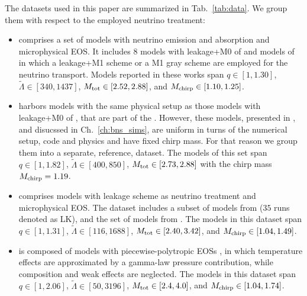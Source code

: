 The datasets used in this paper are summarized in Tab.~\ref{tab:data}.
We group them with respect to the employed neutrino treatment:

\begin{itemize}
    \item \DSheatcool{} comprises a set of models with neutrino emission 
    and absorption and microphysical \ac{EOS}. It includes 
    $8$ models with leakage+M0 of \cite{Radice:2018pdn} and models 
    of \cite{Sekiguchi:2015dma,Sekiguchi:2016bjd,Vincent:2019kor}
    in which a leakage+M1 scheme or a M1 gray scheme are employed for the neutrino transport. 
    Models reported in these works span 
    $q\in[1, 1.30]$, 
    $\tilde{\Lambda}\in[340, 1437]$, 
    $M_{\rm tot}\in[2.52,2.88]$, 
    and $M_{\rm chirp}\in[1.10,1.25]$.
    \item \DSrefset{} harbors models with the same physical setup as 
    those models with leakage+M0 of \cite{Radice:2018pdn}, that are 
    part of the \DSheatcool{}. However, these models, presented in 
    \cite{Perego:2019adq,Nedora:2019jhl,Bernuzzi:2020txg,Nedora:2020pak}, 
    and disucssed in Ch.~\ref{ch:bns_sims}, are uniform in turns of the 
    numerical setup, code and physics and have fixed chirp mass. 
    For that reason we group them into a separate, reference, dataset. 
    The models of this set span $q\in[1, 1.82]$, 
    $\tilde{\Lambda}\in[400, 850]$, 
    $M_{\rm tot}\in[2.73,2.88]$ with 
    the chirp mass $M_{\rm chirp}=1.19$.
    \item \DScool{} comprises models with leakage scheme as neutrino treatment and microphysical \ac{EOS}.
    The dataset includes a subset of models from \cite{Radice:2018pdn} ($35$ runs denoted as LK),
    and the set of models from \cite{Lehner:2016lxy}.
    The models in this dataset span $q\in[1, 1.31]$, 
    $\tilde{\Lambda}\in[116, 1688]$, 
    $M_{\rm tot}\in[2.40,3.42]$, 
    and $M_{\rm chirp}\in[1.04,1.49]$.
    \item \DSnone{} is composed of models with piecewise-polytropic \acp{EOS} 
    \cite{Hotokezaka:2012ze,Dietrich:2015iva,Dietrich:2016hky,Kiuchi:2019lls,Bauswein:2013yna},
    in which temperature effects are approximated by a
    gamma-law pressure contribution, while
    composition and weak effects are neglected.
    The models in this dataset span 
    $q\in[1, 2.06]$, 
    $\tilde{\Lambda}\in[50, 3196]$, 
    $M_{\rm tot}\in[2.4,4.0]$, 
    and $M_{\rm chirp}\in[1.04,1.74]$.
\end{itemize}

